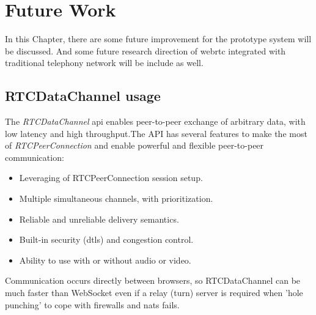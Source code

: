 \chapter{Future Work}
\label{chp:future_work}

\noindent In this Chapter, there are some future improvement for the prototype system will be discussed. And some future research direction of \gls{webrtc} integrated with traditional telephony network will be include as well.

\section{RTCDataChannel usage}

\par The \textit{RTCDataChannel} \gls{api} enables peer-to-peer exchange of arbitrary data, with low latency and high throughput.The API has several features to make the most of \textit{RTCPeerConnection} and enable powerful and flexible peer-to-peer communication\cite{html5rock:webrtc}:

\begin{itemize}[topsep=-1em,parsep=0em,itemsep=0em]
    \item Leveraging of RTCPeerConnection session setup.
    \item Multiple simultaneous channels, with prioritization.
    \item Reliable and unreliable delivery semantics.
    \item Built-in security (\gls{dtls}) and congestion control.
    \item Ability to use with or without audio or video.
\end{itemize}

\par Communication occurs directly between browsers, so RTCDataChannel can be much faster than WebSocket even if a relay (\gls{turn}) server is required when 'hole punching' to cope with firewalls and \gls{nat}s fails.

